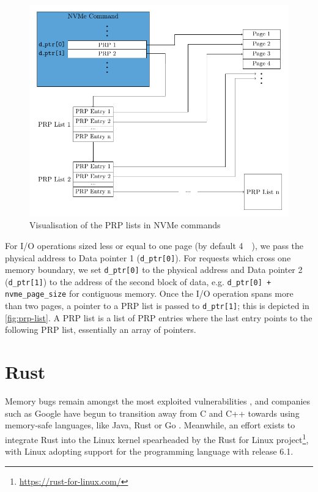\begin{figure}[]
  \centering
    \includegraphics[width=\textwidth]{figures/prp-list}
    \caption{Visualisation of the PRP lists in NVMe commands}
    \label{fig:prp-list}
\end{figure}

For I/O operations sized less or equal to one page (by default \qty{4}{\kibi\byte}), we pass the physical address to Data pointer 1 (\texttt{d\_ptr[0]}). For requests which cross one memory boundary, we set \texttt{d\_ptr[0]} to the physical address and Data pointer 2 (\texttt{d\_ptr[1]}) to the address of the second block of data, e.g. \texttt{d\_ptr[0] + nvme\_page\_size} for contiguous memory. Once the I/O operation spans more than two pages, a pointer to a PRP list is passed to \texttt{d\_ptr[1]}; this is depicted in \autoref{fig:prp-list}. A PRP list is a list of PRP entries where the last entry points to the following PRP list, essentially an array of pointers.

\section{Rust}
Memory bugs remain amongst the most exploited vulnerabilities \cite{mitre}, and companies such as Google have begun to transition away from C and C++ towards using memory-safe languages, like Java, Rust or Go \cite{google}. Meanwhile, an effort exists to integrate Rust into the Linux kernel spearheaded by the Rust for Linux project\footnote{\url{https://rust-for-linux.com/}}, with Linux adopting support for the programming language with release 6.1.

